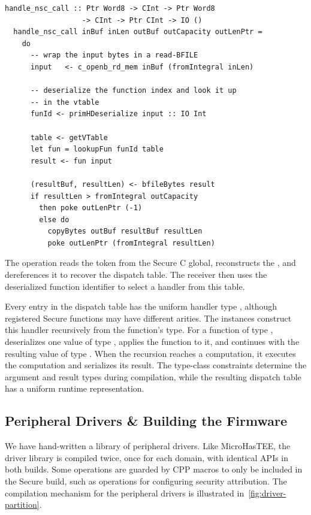 \documentclass[sigconf]{acmart}
\begin{document}
\begin{lstlisting}[style=haskell]
  handle_nsc_call :: Ptr Word8 -> CInt -> Ptr Word8
                  -> CInt -> Ptr CInt -> IO ()
  handle_nsc_call inBuf inLen outBuf outCapacity outLenPtr =
    do
      -- wrap the input bytes in a read-BFILE
      input   <- c_openb_rd_mem inBuf (fromIntegral inLen)

      -- deserialize the function index and look it up
      -- in the vtable
      funId <- primHDeserialize input :: IO Int

      table <- getVTable
      let fun = lookupFun funId table
      result <- fun input

      (resultBuf, resultLen) <- bfileBytes result
      if resultLen > fromIntegral outCapacity
        then poke outLenPtr (-1)
        else do
          copyBytes outBuf resultBuf resultLen
          poke outLenPtr (fromIntegral resultLen)
\end{lstlisting}

The  operation reads the token from the Secure C global, reconstructs the , and dereferences it to recover the dispatch table.
The receiver then uses the deserialized function identifier to select a handler from this table.

Every entry in the dispatch table has the uniform handler type
, although registered Secure functions may have different arities.
The  instances construct this handler recursively from the function's type.
For a function of type ,  deserializes one value of type , applies the function to it, and continues with the resulting value of type .
When the recursion reaches a  computation, it executes the computation and serializes its result.
The type-class constraints determine the argument and result types during compilation, while the resulting dispatch table has a uniform runtime representation.

\subsection{Peripheral Drivers \& Building the Firmware}

We have hand-written a library of peripheral drivers.
Like MicroHasTEE, the driver library is compiled twice, once for each domain, with identical APIs in both builds.
Some operations are guarded by CPP macros to only be included in the Secure build, such as operations for configuring security attribution.
The compilation mechanism for the peripheral drivers is illustrated in~\cref{fig:driver-partition}.
\end{document}
